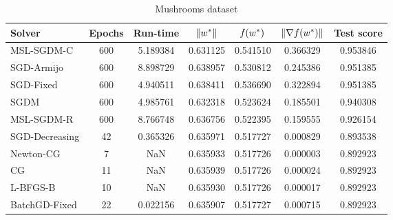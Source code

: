 \begin{table}
\caption{Mushrooms dataset}
\label{tab:mush-tab}
\centering
\begin{tabular}{lS[drop-zero-decimal]S[round-precision=4]S[round-precision=6]S[round-precision=6]S[exponent-mode=scientific]S[round-precision=6]}
\toprule
Solver & {Epochs} & {Run-time} & {$\lVert w^\ast\rVert$} & {$\operatorname*{\mathit{f}}(w^\ast)$} & {$\lVert\nabla f(w^\ast)\rVert$} & {Test score} \\
\midrule
MSL-SGDM-C & 600 & 5.189384 & 0.631125 & 0.541510 & 0.366329 & 0.953846 \\
SGD-Armijo & 600 & 8.898729 & 0.638957 & 0.530812 & 0.245386 & 0.951385 \\
SGD-Fixed & 600 & 4.940511 & 0.638411 & 0.536690 & 0.322894 & 0.951385 \\
SGDM & 600 & 4.985761 & 0.632318 & 0.523624 & 0.185501 & 0.940308 \\
MSL-SGDM-R & 600 & 8.766748 & 0.636756 & 0.522395 & 0.159555 & 0.926154 \\
SGD-Decreasing & 42 & 0.365326 & 0.635971 & 0.517727 & 0.000829 & 0.893538 \\
Newton-CG & 7 & NaN & 0.635933 & 0.517726 & 0.000003 & 0.892923 \\
CG & 11 & NaN & 0.635939 & 0.517726 & 0.000024 & 0.892923 \\
L-BFGS-B & 10 & NaN & 0.635930 & 0.517726 & 0.000017 & 0.892923 \\
BatchGD-Fixed & 22 & 0.022156 & 0.635907 & 0.517727 & 0.000715 & 0.892923 \\
\bottomrule
\end{tabular}
\end{table}


